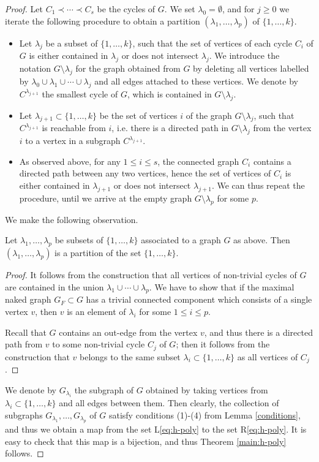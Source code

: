 \begin{proof}
Let $C_1\prec \cdots \prec C_s$ be the cycles of $G$.
We set $\lambda_0=\emptyset$, and for $j\geq 0$ we iterate the following procedure to obtain a partition $(\lambda_1, \ldots ,\lambda_p)$ of $\{1, \ldots ,k\}$.
 \begin{itemize}
 \item Let $\lambda_j$ be a subset of $\{1, \ldots ,k\}$, such that the set of vertices of each cycle $C_i$ of $G$ is either contained in $\lambda_j$ or does not intersect $\lambda_j$. We introduce the notation $G{\setminus \lambda_j}$ for the graph obtained from $G$  by deleting all vertices labelled by $\lambda_0\cup\lambda_1\cup \cdots \cup\lambda_j$ and all edges attached to these vertices. We denote by $C^{\lambda_{j+1}}$ the smallest cycle of $G$, which is contained in $G{\setminus \lambda_j}$. 
 \item Let $\lambda_{j+1}\subset\{1, \ldots ,k\}$  be the set of vertices $i$ of the 
 graph $G{\setminus\lambda_j}$, such that $C^{\lambda_{j+1}}$ is reachable from 
 $i$, i.e.  there is a directed path in $G{\setminus\lambda_j}$ from the vertex 
 $i$ to a vertex in a subgraph $C^{\lambda_{j+1}}$.
\item As observed above, for any $1\leq i\leq s$, the connected graph $C_i$ contains a directed path between any two vertices, hence the set of vertices of $C_i$ is either contained in $\lambda_{j+1}$ or does not intersect $\lambda_{j+1}$. We can thus repeat the procedure, until we arrive at the empty graph $G\setminus\lambda_p$ for some $p$. 
 \end{itemize}
 
We make the following observation.
\begin{lemma}
Let $\lambda_1, \ldots ,\lambda_p$ be subsets of $\{1, \ldots ,k\}$ associated to a graph $G$ as above.  Then $(\lambda_1, \ldots ,\lambda_p)$ is a partition of the set $\{1, \ldots ,k\}$.
\end{lemma}
\begin{proof} 
It follows from the construction that all vertices of non-trivial cycles of $G$ are contained in the union $\lambda_1\cup \cdots \cup \lambda_p$.
We have to show that if the maximal naked graph  $G_F\subset G$ has a trivial connected component which consists of a single vertex $v$, then $v$ is an element of $\lambda_i$ for some $1\leq i \leq p$. 

Recall that $G$ contains an out-edge from the vertex $v$, and thus there is a directed path from $v$ to some non-trivial cycle $C_j$ of $G$; then it follows from the construction that $v$ belongs to the same subset $\lambda_i\subset\{1, \ldots ,k\}$ as all vertices of $C_j$. 
\end{proof}
We denote by $G_{\lambda_i}$ the subgraph of $G$ obtained by taking vertices from $\lambda_i\subset\{1, \ldots ,k\}$ and all edges between them. Then clearly, the collection of subgraphs $G_{\lambda_1}, \ldots ,G_{\lambda_p}$ of $G$ satisfy conditions (1)-(4) from Lemma \ref{conditions}, and thus we obtain a map from the set L\eqref{eq:h-poly} to the set R\eqref{eq:h-poly}. 
 It is easy to check that this map is a bijection, and thus Theorem \ref{main:h-poly} follows.
\end{proof}



